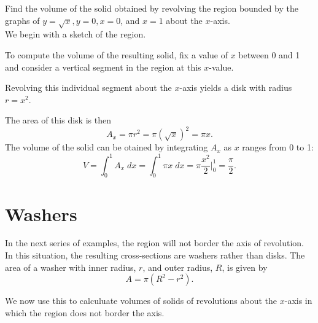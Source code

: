 \documentclass{ximera}
\begin{document}
\begin{example}[example 4] Find the volume of the solid obtained by revolving the region bounded by the graphs of $y=\sqrt x, y=0, x=0$, and $x = 1$
about the $x$-axis.\\
We begin with a sketch of the region.


To compute the volume of the resulting solid, fix a value of $x$ between 0 and 1 and consider a vertical segment in the region at this $x$-value.


Revolving this individual segment about the $x$-axis yields a disk with radius $r = x^2$. 


The area of this disk is then
\[
A_x = \pi r^2  = \pi (\sqrt x)^2  = \pi x.
\]
The volume of the solid can be otained by integrating $A_x$ as $x$ ranges from 0 to 1:
\[
V = \int_0^1 A_x \; dx  = \int_0^1 \pi x \; dx = \pi \frac{x^2}{2}\bigg|_0^1 = \frac{\pi}{2}.
\]



\end{example}



\section{Washers} In the next series of examples, the region will not border the axis of revolution. 
In this situation, the resulting cross-sections are washers rather than disks.
The area of a washer with inner radius, $r$, and outer radius, $R$, is given by 
\[
A = \pi(R^2 - r^2).
\]


We now use this to calculuate volumes of solids of revolutions about the $x$-axis in which the region does not border the axis.
\end{document}
